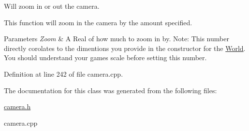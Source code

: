 Will zoom in or out the camera. 

This function will zoom in the camera by the amount specified. 
\begin{DoxyParams}{Parameters}
{\em Zoom} & A Real of how much to zoom in by. Note: This number directly corolates to the dimentions you provide in the constructor for the \hyperlink{classMezzanine_1_1World}{World}. You should understand your games scale before setting this number. \\
\hline
\end{DoxyParams}


Definition at line 242 of file camera.cpp.



The documentation for this class was generated from the following files:\begin{DoxyCompactItemize}
\item 
\hyperlink{camera_8h}{camera.h}\item 
camera.cpp\end{DoxyCompactItemize}
